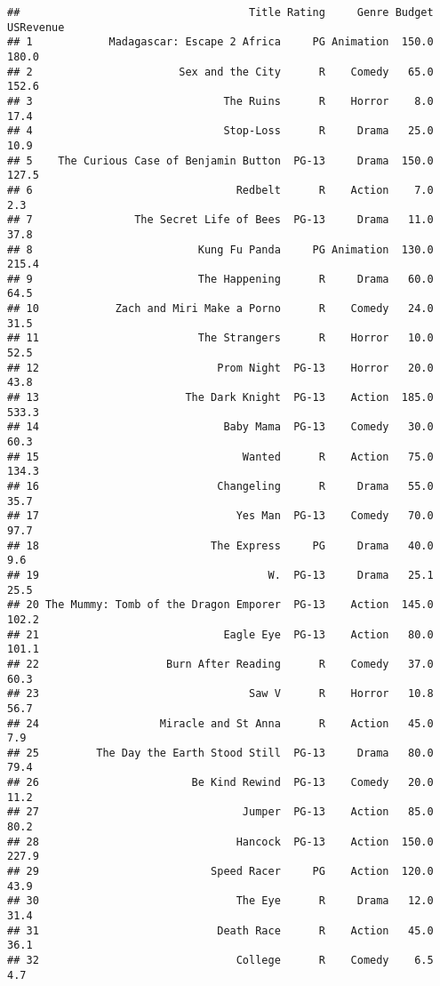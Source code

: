 \documentclass[
]{article}
\begin{document}
\begin{verbatim}
##                                    Title Rating     Genre Budget USRevenue
## 1            Madagascar: Escape 2 Africa     PG Animation  150.0     180.0
## 2                       Sex and the City      R    Comedy   65.0     152.6
## 3                              The Ruins      R    Horror    8.0      17.4
## 4                              Stop-Loss      R     Drama   25.0      10.9
## 5    The Curious Case of Benjamin Button  PG-13     Drama  150.0     127.5
## 6                                Redbelt      R    Action    7.0       2.3
## 7                The Secret Life of Bees  PG-13     Drama   11.0      37.8
## 8                          Kung Fu Panda     PG Animation  130.0     215.4
## 9                          The Happening      R     Drama   60.0      64.5
## 10            Zach and Miri Make a Porno      R    Comedy   24.0      31.5
## 11                         The Strangers      R    Horror   10.0      52.5
## 12                            Prom Night  PG-13    Horror   20.0      43.8
## 13                       The Dark Knight  PG-13    Action  185.0     533.3
## 14                             Baby Mama  PG-13    Comedy   30.0      60.3
## 15                                Wanted      R    Action   75.0     134.3
## 16                            Changeling      R     Drama   55.0      35.7
## 17                               Yes Man  PG-13    Comedy   70.0      97.7
## 18                           The Express     PG     Drama   40.0       9.6
## 19                                    W.  PG-13     Drama   25.1      25.5
## 20 The Mummy: Tomb of the Dragon Emporer  PG-13    Action  145.0     102.2
## 21                             Eagle Eye  PG-13    Action   80.0     101.1
## 22                    Burn After Reading      R    Comedy   37.0      60.3
## 23                                 Saw V      R    Horror   10.8      56.7
## 24                   Miracle and St Anna      R    Action   45.0       7.9
## 25         The Day the Earth Stood Still  PG-13     Drama   80.0      79.4
## 26                        Be Kind Rewind  PG-13    Comedy   20.0      11.2
## 27                                Jumper  PG-13    Action   85.0      80.2
## 28                               Hancock  PG-13    Action  150.0     227.9
## 29                           Speed Racer     PG    Action  120.0      43.9
## 30                               The Eye      R     Drama   12.0      31.4
## 31                            Death Race      R    Action   45.0      36.1
## 32                               College      R    Comedy    6.5       4.7

\end{verbatim}
\end{document}

